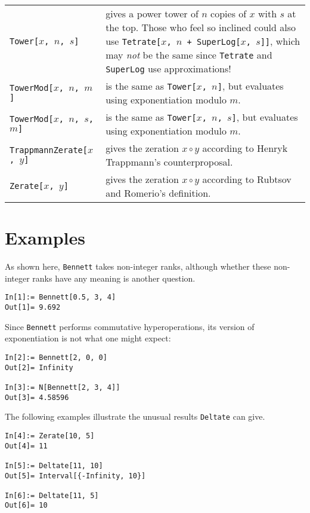 \documentclass[letterpaper]{article}
\begin{document}
\begin{longtable}{p{1.5in}p{3.5in}}
\verb|Tower[|$x$\verb|, |$n$\verb|, |$s$\verb|]| & gives a power tower of $n$ copies of $x$ with $s$ at the top.  Those who feel so inclined could also use \verb|Tetrate[|$x$\verb|, |$n$\verb| + SuperLog[|$x$\verb|, |$s$\verb|]]|, which may \emph{not} be the same since \verb|Tetrate| and \verb|SuperLog| use approximations! \\[6pt]

\verb|TowerMod[|$x$\verb|, |$n$\verb|, |$m$\verb|]| & is the same as \verb|Tower[|$x$\verb|, |$n$\verb|]|, but evaluates using exponentiation modulo $m$. \\[6pt]

\verb|TowerMod[|$x$\verb|, |$n$\verb|, |$s$\verb|, |$m$\verb|]| & is the same as \verb|Tower[|$x$\verb|, |$n$\verb|, |$s$\verb|]|, but evaluates using exponentiation modulo $m$. \\[6pt]

\verb|TrappmannZerate[|$x$\verb|, |$y$\verb|]| & gives the zeration $x \circ y$ according to Henryk Trappmann's counterproposal. \\[6pt]

\verb|Zerate[|$x$\verb|, |$y$\verb|]| & gives the zeration $x \circ y$ according to Rubtsov and Romerio's definition.

\end{longtable}

\section{Examples}

As shown here, \verb|Bennett| takes non-integer ranks, although whether these non-integer ranks have any meaning is another question.

\begin{verbatim}
In[1]:= Bennett[0.5, 3, 4]
Out[1]= 9.692
\end{verbatim}

Since \verb|Bennett| performs commutative hyperoperations, its version of exponentiation is not what one might expect:

\begin{verbatim}
In[2]:= Bennett[2, 0, 0]
Out[2]= Infinity

In[3]:= N[Bennett[2, 3, 4]]
Out[3]= 4.58596
\end{verbatim}

The following examples illustrate the unusual results \verb|Deltate| can give.

\begin{verbatim}
In[4]:= Zerate[10, 5]
Out[4]= 11

In[5]:= Deltate[11, 10]
Out[5]= Interval[{-Infinity, 10}]

In[6]:= Deltate[11, 5]
Out[6]= 10
\end{verbatim}
\end{document}
